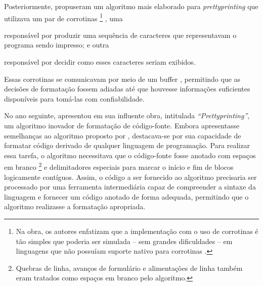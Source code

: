 \documentclass
 [11pt,a4paper,english,brazil,openright,sumario=tradicional,twoside]
 {abntex2}
\begin{document}
 Posteriormente, \textcite{hearn-1979-one} propuseram um algoritmo mais
 elaborado para \textit{prettyprinting} que utilizava um par de corrotinas%
 \footnote
  {Na obra, os autores enfatizam que a implementação com o uso de corrotinas é
   tão simples que poderia ser simulada -- sem grandes dificuldades -- em
   linguagens que não possuíam suporte nativo para corrotinas
   \cite[53]{hearn-1979-one}.}%
 , uma
 \begin{inparaenum}
  \item responsável por produzir uma sequência de caracteres que representavam
        o programa sendo impresso; e outra
  \item responsável por decidir como esses caracteres seriam exibidos.
 \end{inparaenum}
 Essas corrotinas se comunicavam por meio de um buffer , permitindo
 que as decisões de formatação fossem adiadas até que houvesse informações
 suficientes disponíveis para tomá-las com confiabilidade.

 No ano seguinte, \textcite{oppen-1980-prettyprinting} apresentou em sua
 influente obra, intitulada \textit{``Prettyprinting''}, um algoritmo inovador
 de formatação de código-fonte. Embora apresentasse semelhanças ao algoritmo
 proposto por \textcite{hearn-1979-one}, destacava-se por sua capacidade de
 formatar código derivado de qualquer linguagem de programação. Para realizar
 essa tarefa, o algoritmo necessitava que o código-fonte fosse anotado com
 espaços em branco%
 \footnote
  {Quebras de linha, avanços de formulário e alimentações de linha também eram
   tratados como espaços em branco pelo algoritmo.}
 e delimitadores especiais para marcar o início e fim de blocos logicamente
 contíguos. Assim, o código a ser fornecido ao algoritmo precisaria ser
 processado por uma ferramenta intermediária capaz de compreender a sintaxe da
 linguagem e fornecer um código anotado de forma adequada, permitindo que o
 algoritmo realizasse a formatação apropriada.
\end{document}

